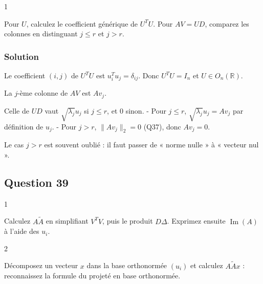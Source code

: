\documentclass[11pt,a4paper]{article}
\newcommand{\equationajustee}[1]{%
  \sbox{\boiteequation}{$\displaystyle #1$}%
  \ifdim\wd\boiteequation>\linewidth
    \[\resizebox{\linewidth}{!}{\usebox{\boiteequation}}\]%
  \else
    \[#1\]%
  \fi}
\begin{document}
\begin{indication}{1}

Pour \(U\), calculez le coefficient générique de \(U^TU\). Pour \(AV=UD\), comparez les colonnes en distinguant \(j\leqslant r\) et \(j>r\).

\end{indication}

\hypertarget{solution-37}{%
\subsubsection{Solution}\label{solution-37}}

Le coefficient \((i,j)\) de \(U^TU\) est \(u_i^Tu_j=\delta_{ij}\). Donc \(U^TU=I_n\) et \(U\in O_n(\mathbb R)\).

La \(j\)-ème colonne de \(AV\) est \(Av_j\).

Celle de \(UD\) vaut \(\sqrt{\lambda_j}u_j\) si \(j\leqslant r\), et \(0\) sinon.
- Pour \(j\leqslant r\), \(\sqrt{\lambda_j}u_j=Av_j\) par définition de \(u_j\).
- Pour \(j>r\), \(\|Av_j\|_2=0\) (Q37), donc \(Av_j=0\).

\equationajustee{\boxed{\begin{aligned}{}&U\in O_n(\mathbb R),\\
&AV=UD,\\
&A=UDV^T.
\end{aligned}}}

\begin{piege}

Le cas \(j>r\) est souvent oublié : il faut passer de « norme nulle » à « vecteur nul ».

\end{piege}

\hypertarget{question-39}{%
\subsection{Question 39}\label{question-39}}

\begin{indication}{1}

Calculez \(A\tilde A\) en simplifiant \(V^TV\), puis le produit \(D\Delta\). Exprimez ensuite \(\operatorname{Im}(A)\) à l'aide des \(u_i\).

\end{indication}

\begin{indication}{2}

Décomposez un vecteur \(x\) dans la base orthonormée \((u_i)\) et calculez \(A\tilde Ax\) : reconnaissez la formule du projeté en base orthonormée.

\end{indication}
\end{document}
